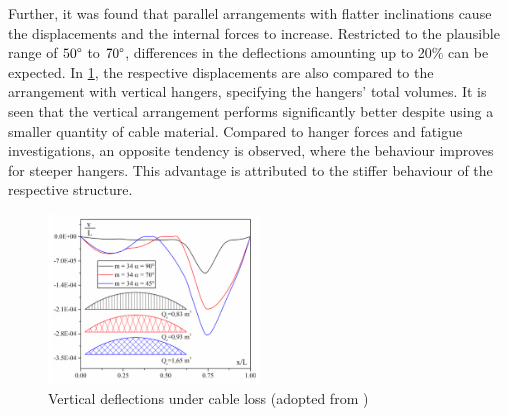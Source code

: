 Further, it was found that parallel arrangements with flatter inclinations cause the displacements and the internal forces to increase. Restricted to the plausible range of $50\degree$ to $70\degree$, differences in the deflections amounting up to 20\% can be expected. In \cref{fig:Bruno2}, the respective displacements are also compared to the arrangement with vertical hangers, specifying the hangers' total volumes. It is seen that the vertical arrangement performs significantly better despite using a smaller quantity of cable material. Compared to hanger forces and fatigue investigations, an opposite tendency is observed, where the behaviour improves for steeper hangers. This advantage is attributed to the stiffer behaviour of the respective structure.
\begin{figure}[H]
    \centering
    \includegraphics[width=0.50\textwidth]{Pictures/BrunoArrangements.PNG}
    \caption{Vertical deflections under cable loss (adopted from \cite{Bruno})}
    \label{fig:Bruno2}
\end{figure}

